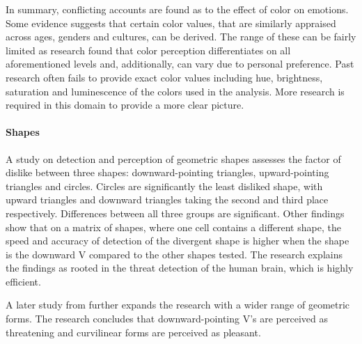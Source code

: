 		In summary, conflicting accounts are found as to the effect of color on emotions. Some evidence suggests that certain color values, that are similarly appraised across ages, genders and cultures, can be derived. The range of these can be fairly limited as research found that color perception differentiates on all aforementioned levels and, additionally, can vary due to personal preference. Past research often fails to provide exact color values including hue, brightness, saturation and luminescence of the colors used in the analysis. More research is required in this domain to provide a more clear picture. 
		
		
		
		\paragraph{Shapes}
		
		A study \cite{Larson2007} on detection and perception of geometric shapes assesses the factor of dislike between three shapes: downward-pointing triangles, upward-pointing triangles and circles. Circles are significantly the least disliked shape, with upward triangles and downward triangles taking the second and third place respectively. Differences between all three groups are significant. Other findings show that on a matrix of shapes, where one cell contains a different shape, the speed and accuracy of detection of the divergent shape is higher when the shape is the downward V compared to the other shapes tested. The research explains the findings as rooted in the threat detection of the human brain, which is highly efficient.
		
		A later study from \cite{Larson2012} further expands the research with a wider range of geometric forms. The research concludes that downward-pointing V’s are perceived as threatening and curvilinear forms are perceived as pleasant.
		
				
